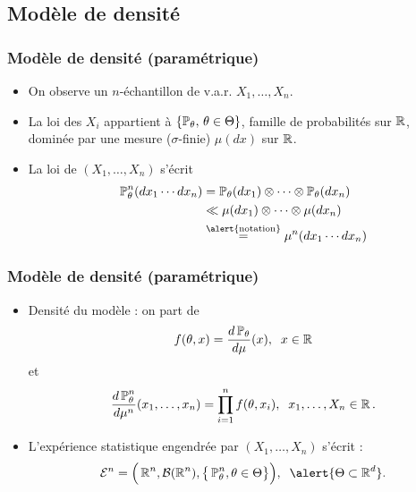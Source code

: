 \subsection{Modèle de densité}

\begin{frame}
\frametitle{Modèle de densité (paramétrique)}
\begin{itemize}
\item On observe un $n$-échantillon de v.a.r. $X_1,\ldots, X_n$.
\item La loi des $X_i$ appartient à
$\{\operatorname{{\mathbb P}}_\theta,\,\theta \in \Theta\}$, famille de \alert{probabilités sur $\operatorname{{\mathbb R}}$}, \alert{ dominée} par une mesure ($\sigma$-finie) $\mu(dx)$ sur $\operatorname{{\mathbb R}}$.
\item La loi de $(X_1,\ldots,X_n)$ s'écrit
\begin{align*}
\PP_\theta^n(dx_1\cdots dx_n) & = \PP_\theta(dx_1)\otimes \cdots \otimes \PP_\theta(dx_n) \\
& \ll  \mu(dx_1)\otimes \cdots \otimes \mu(dx_n) \\
& \stackrel{\text{\alert{notation}}}{=} \mu^n(dx_1\cdots dx_n)
\end{align*}
\end{itemize}
\end{frame}

\begin{frame}
\frametitle{Modèle de densité (paramétrique)}
\begin{itemize}
\item \alert{ Densité du modèle} : on part de
$$f(\theta,x)=\frac{d\operatorname{{\mathbb P}}_\theta}{d\mu}(x),\;\;x\in \operatorname{{\mathbb R}}$$
et
$$\frac{d\operatorname{{\mathbb P}}_\theta^n}{d\mu^{n}}(x_1,\ldots, x_n) = \prod_{i = 1}^n f(\theta,x_i),\;\;x_1,\ldots, X_n \in \operatorname{{\mathbb R}}.$$
\item  \alert{L'expérience statistique} engendrée par $(X_1,\ldots, X_n)$ s'écrit :
$${\mathcal E}^n = \Big(\R^n, {\mathcal B}(\R^n), \big\{\PP_\theta^n,\theta \in \Theta\big\}\Big),\;\;\alert{\Theta \subset \R^d}.$$
\end{itemize}
\end{frame}

